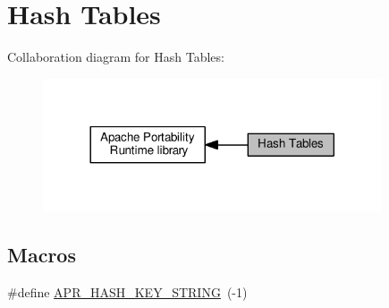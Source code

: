 \hypertarget{group__apr__hash}{}\section{Hash Tables}
\label{group__apr__hash}
Collaboration diagram for Hash Tables\+:
\nopagebreak
\begin{figure}[H]
\begin{center}
\leavevmode
\includegraphics[width=284pt]{group__apr__hash}
\end{center}
\end{figure}
\subsection*{Macros}
\begin{DoxyCompactItemize}
\item 
\#define \hyperlink{group__apr__hash_ga3ba32541f2717b394000f87f38c7e12d}{A\+P\+R\+\_\+\+H\+A\+S\+H\+\_\+\+K\+E\+Y\+\_\+\+S\+T\+R\+I\+NG}~(-\/1)
\end{DoxyCompactItemize}
